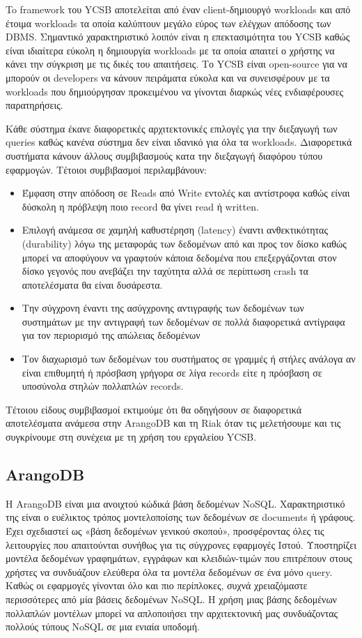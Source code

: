\documentclass[conference]{IEEEtran}
\begin{document}
        To framework του YCSB αποτελείται από έναν client-δημιουργό workloads και από έτοιμα workloads τα οποία καλύπτουν μεγάλο εύρος των ελέγχων απόδοσης των DBMS. Σημαντικό χαρακτηριστικό λοιπόν είναι η επεκτασιμότητα του YCSB καθώς είναι ιδιαίτερα εύκολη η δημιουργία workloads με τα οποία απαιτεί ο χρήστης να κάνει την σύγκριση με τις δικές του απαιτήσεις. Το YCSB είναι open-source για να μπορούν οι developers να κάνουν πειράματα εύκολα και να συνεισφέρουν με τα workloads που δημιούργησαν προκειμένου να γίνονται διαρκώς νέες ενδιαφέρουσες παρατηρήσεις.

        Κάθε σύστημα έκανε διαφορετικές αρχιτεκτονικές επιλογές για την διεξαγωγή των queries καθώς κανένα σύστημα δεν είναι ιδανικό για όλα τα workloads. Διαφορετικά συστήματα κάνουν άλλους συμβιβασμούς κατα την διεξαγωγή διαφόρου τύπου εφαρμογών. Τέτοιοι συμβιβασμοί περιλαμβάνουν: 
        \begin{itemize}
        \item
        Έμφαση στην απόδοση σε Reads από Write εντολές και αντίστροφα καθώς είναι δύσκολη η πρόβλεψη ποιο record θα γίνει read ή written.
        \item
        Επιλογή ανάμεσα σε χαμηλή καθυστέρηση (latency) έναντι ανθεκτικότητας (durability) λόγω της μεταφοράς των δεδομένων από και προς τον δίσκο καθώς μπορεί να αποφύγουν να γραφτούν κάποια δεδομένα που επεξεργάζονται στον δίσκο γεγονός που ανεβάζει την ταχύτητα αλλά σε περίπτωση crash τα αποτελέσματα θα είναι δυσάρεστα.
        \item
        Την σύγχρονη έναντι της ασύγχρονης αντιγραφής των δεδομένων των συστημάτων με την αντιγραφή των δεδομένων σε πολλά διαφορετικά αντίγραφα για τον περιορισμό της απώλειας δεδομένων
        \item
        Τον διαχωρισμό των δεδομένων του συστήματος σε γραμμές ή στήλες ανάλογα αν είναι επιθυμητή ή πρόσβαση γρήγορα σε λίγα records είτε η πρόσβαση σε υποσύνολα στηλών πολλαπλών records.
    \end{itemize}

Τέτοιου είδους συμβιβασμοί εκτιμούμε ότι θα οδηγήσουν σε διαφορετικά αποτελέσματα ανάμεσα στην ArangoDB και τη Riak όταν τις μελετήσουμε και τις συγκρίνουμε στη συνέχεια με τη χρήση του εργαλείου YCSB.

\subsection{ArangoDB}
Η ArangoDB είναι μια ανοιχτού κώδικά βάση δεδομένων NoSQL. Χαρακτηριστικό της είναι ο ευέλικτος τρόπος μοντελοποίσης των δεδομένων σε documents ή γράφους. Έχει σχεδιαστεί ως «βάση δεδομένων γενικού σκοπού», προσφέροντας όλες τις λειτουργίες που απαιτούνται συνήθως για τις σύγχρονες εφαρμογές Ιστού. Υποστηρίζει μοντέλα δεδομένων γραφημάτων, εγγράφων και κλειδιών-τιμών που επιτρέπουν στους χρήστες να συνδυάζουν ελεύθερα όλα τα μοντέλα δεδομένων σε ένα μόνο query. Καθώς οι εφαρμογές γίνονται όλο και πιο περίπλοκες, συχνά χρειαζόμαστε περισσότερες από μία βάσεις δεδομένων NoSQL. Η χρήση μιας βάσης δεδομένων πολλαπλών μοντέλων μπορεί να απλοποιήσει την αρχιτεκτονική μας συνδυάζοντας πολλούς τύπους NoSQL σε μια ενιαία υποδομή.
\end{document}
